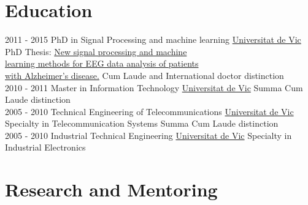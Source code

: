 \documentclass[letterpaper]{DS_class_file} %
\begin{document}


    \section{Education}

    \begin{twenty} %
        \twentyitem
        {2011 - 2015}
        {}
        {PhD in Signal Processing and machine learning}
        {\href{https://www.uvic.cat/}{Universitat de Vic}}
        {PhD Thesis: \href{http://www.tdx.cat/handle/10803/290853}{New signal processing and machine \\ learning methods for EEG data analysis of patients \\ with Alzheimer's disease.}}
        {Cum Laude and International doctor distinction}
        \\
        \twentyitem
        {2010 - 2011}
        {}
        {Master in Information Technology}
        {\href{https://www.uvic.cat/}{Universitat de Vic}}
        {}
        {Summa Cum Laude distinction}
        \\
        \twentyitem
        {2005 - 2010}
        {}
        {Technical Engineering of Telecommunications}
        {\href{https://www.uvic.cat/}{Universitat de Vic}}
        {Specialty in Telecommunication Systems}
        {Summa Cum Laude distinction}
        \\
        \twentyitem
        {2005 - 2010}
        {}
        {Industrial Technical Engineering}
        {\href{https://www.uvic.cat/}{Universitat de Vic}}
        {Specialty in Industrial Electronics}
        {}
    \end{twenty}

    \vspace{-1mm}


    \section{Research and Mentoring}
\end{document}
